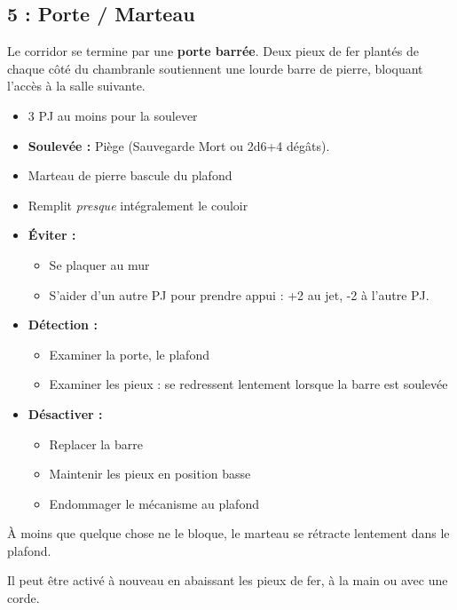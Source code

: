 \newpage
\subsection{5 : Porte / Marteau}\label{n1:s5}
Le corridor se termine par une \textbf{porte barrée}.
Deux pieux de fer plantés de chaque côté du chambranle soutiennent une lourde barre de pierre, bloquant l’accès à la salle suivante.

\begin{itemize}
  \item 3 PJ au moins pour la soulever
  \item \textbf{Soulevée :} Piège (Sauvegarde Mort ou 2d6+4 dégâts).
\end{itemize}

\begin{highlight}[Le piège]
  \begin{itemize}
    \item Marteau de pierre bascule du plafond
    \item Remplit \emph{presque} intégralement le couloir
    \item \textbf{\'Eviter :}
    \begin{itemize}
      \item Se plaquer au mur
      \item S'aider d'un autre PJ pour prendre appui : +2 au jet, -2 à l'autre PJ.
    \end{itemize}
    \item \textbf{Détection :}
    \begin{itemize}
      \item Examiner la porte, le plafond
      \item Examiner les pieux : se redressent lentement lorsque la barre est soulevée
    \end{itemize}
    \item \textbf{Désactiver :}
    \begin{itemize}
      \item Replacer la barre
      \item Maintenir les pieux en position basse
      \item Endommager le mécanisme au plafond
    \end{itemize}
  \end{itemize}
\end{highlight}

À moins que quelque chose ne le bloque, le marteau se rétracte lentement dans le plafond.

Il peut être activé à nouveau en abaissant les pieux de fer, à la main ou avec une corde.

